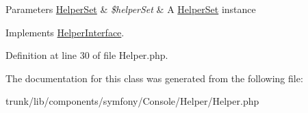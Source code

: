 \begin{DoxyParams}[1]{Parameters}
\hyperlink{class_symfony_1_1_components_1_1_console_1_1_helper_1_1_helper_set}{HelperSet} & {\em \$helperSet} & A \hyperlink{class_symfony_1_1_components_1_1_console_1_1_helper_1_1_helper_set}{HelperSet} instance \\
\hline
\end{DoxyParams}


Implements \hyperlink{interface_symfony_1_1_components_1_1_console_1_1_helper_1_1_helper_interface_a3ee5113a3f774a7d5c2fe6dcfd047c77}{HelperInterface}.



Definition at line 30 of file Helper.php.



The documentation for this class was generated from the following file:\begin{DoxyCompactItemize}
\item 
trunk/lib/components/symfony/Console/Helper/Helper.php\end{DoxyCompactItemize}
